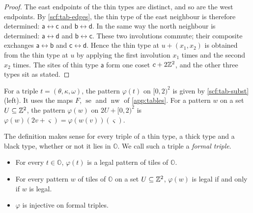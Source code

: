 \begin{proof}
The east endpoints of the thin types are distinct, and so are the west endpoints. By \cref{scf:tab-edges}, the thin type of the east neighbour is therefore determined: $\mathsf a\leftrightarrow\mathsf c$ and $\mathsf b\leftrightarrow\mathsf d$. In the same way the north neighbour is determined: $\mathsf a\leftrightarrow\mathsf d$ and $\mathsf b\leftrightarrow\mathsf c$. These two involutions commute; their composite exchanges $\mathsf a\leftrightarrow\mathsf b$ and $\mathsf c\leftrightarrow\mathsf d$. Hence the thin type at $u+(x_1,x_2)$ is obtained from the thin type at $u$ by applying the first involution $x_1$ times and the second $x_2$ times. The sites of thin type $\mathsf a$ form one coset $c+2\mathbb{Z}^2$, and the other three types sit as stated.
\end{proof}

\begin{definition}\label{scf:def-phi}
For a triple $t=(\theta,\kappa,\omega)$, the pattern $\varphi(t)$ on $[0,2)^2$ is given by \cref{scf:tab-subst} (left). It uses the maps $F$, $\operatorname{se}$ and $\operatorname{nw}$ of \cref{app:tables}. For a pattern $w$ on a set $U\subseteq\mathbb{Z}^2$, the pattern $\varphi(w)$ on $2U+[0,2)^2$ is $\varphi(w)(2v+\varsigma)=\varphi(w(v))(\varsigma)$.
\end{definition}

The definition makes sense for every triple of a thin type, a thick type and a black type, whether or not it lies in $\mathbb O$. We call such a triple a \emph{formal triple}.

\begin{lemma}\label{scf:base}
\begin{itemize}
\item[(a)] For every $t\in\mathbb O$, $\varphi(t)$ is a legal pattern of tiles of $\mathbb O$.
\item[(b)] For every pattern $w$ of tiles of $\mathbb O$ on a set $U\subseteq\mathbb{Z}^2$, $\varphi(w)$ is legal if and only if $w$ is legal.
\item[(c)] $\varphi$ is injective on formal triples.
\end{itemize}
\end{lemma}


